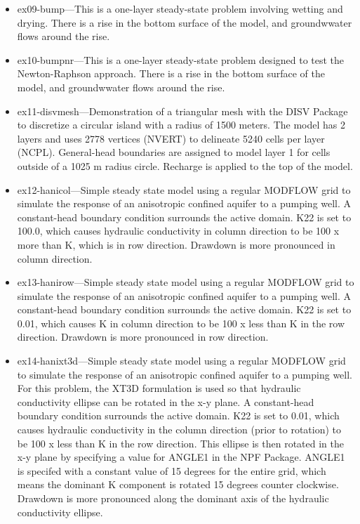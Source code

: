 \begin{itemize}
\item ex09-bump---This is a one-layer steady-state problem involving wetting and drying.  There is a rise in the bottom surface of the model, and groundwwater flows around the rise.
\item ex10-bumpnr---This is a one-layer steady-state problem designed to test the Newton-Raphson approach.  There is a rise in the bottom surface of the model, and groundwwater flows around the rise.
\item ex11-disvmesh---Demonstration of a triangular mesh with the DISV Package to discretize a circular island with a radius of 1500 meters.  The model has 2 layers and uses 2778 vertices (NVERT) to delineate 5240 cells per layer (NCPL).  General-head boundaries are assigned to model layer 1 for cells outside of a 1025 m radius circle.  Recharge is applied to the top of the model. 

\item ex12-hanicol---Simple steady state model using a regular MODFLOW grid to simulate the response of an anisotropic confined aquifer to a pumping well. A constant-head boundary condition surrounds the active domain.  K22 is set to 100.0, which causes hydraulic conductivity in column direction to be 100 x more than K, which is in row direction.  Drawdown is more pronounced in column direction.

\item ex13-hanirow---Simple steady state model using a regular MODFLOW grid to simulate the response of an anisotropic confined aquifer to a pumping well. A constant-head boundary condition surrounds the active domain.  K22 is set to 0.01, which causes K in column direction to be 100 x less than K in the row direction.  Drawdown is more pronounced in row direction.

\item ex14-hanixt3d---Simple steady state model using a regular MODFLOW grid to simulate the response of an anisotropic confined aquifer to a pumping well. For this problem, the XT3D formulation is used so that hydraulic conductivity ellipse can be rotated in the x-y plane.  A constant-head boundary condition surrounds the active domain.  K22 is set to 0.01, which causes hydraulic conductivity in the column direction (prior to rotation) to be 100 x less than K in the row direction.  This ellipse is then rotated in the x-y plane by specifying a value for ANGLE1 in the NPF Package.  ANGLE1 is specifed with a constant value of 15 degrees for the entire grid, which means the dominant K component is rotated 15 degrees counter clockwise.  Drawdown is more pronounced along the dominant axis of the hydraulic conductivity ellipse.


\end{itemize}
